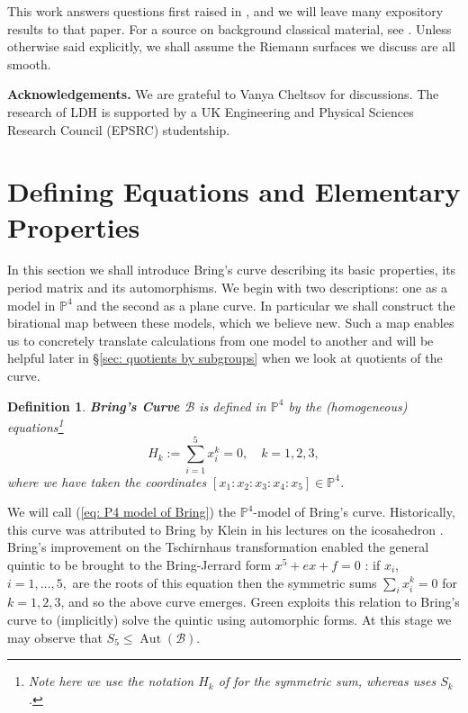\documentclass{amsart}
\newtheorem{definition}[theorem]{Definition}
\newcommand{\bam}[1]{\textbf{#1}}
\DeclareMathOperator{\Aut}{Aut}
\begin{document}
This work answers questions first raised in \cite{Braden2012}, and we will leave many expository results to that paper. For a source on background classical material, see \cite{Farkas1992}. Unless otherwise said explicitly, we shall assume the Riemann surfaces we discuss are all smooth. 

\vspace{0.1in}
\noindent\textbf{Acknowledgements.} We are grateful to Vanya Cheltsov for discussions. The research of LDH is supported by a UK Engineering and Physical Sciences Research Council (EPSRC) studentship. 

\section{Defining Equations and Elementary Properties}\label{sec: defining equations}


In this section we shall introduce Bring's curve describing its basic properties, its period matrix and its automorphisms. We begin with two descriptions: one as a model in $\mathbb{P}^4$ and the second as a plane curve. In particular we shall construct the birational map between these models, which we believe new. Such a map enables us to concretely translate calculations from one model to another and will be helpful later in \S\ref{sec: quotients by subgroups} when we look at quotients of the curve. 

\begin{definition}
\bam{Bring's Curve $\mathcal{B}$} is defined in $\mathbb{P}^4$ by the (homogeneous) equations\footnote{Note here we use the notation $H_k$ of \cite{Burns1983} for the symmetric sum, whereas \cite{Edge1978} uses $S_k$.}
\begin{equation}\label{eq: P4 model of Bring}
H_k := \sum_{i=1}^5 x_i^k = 0  , \quad k=1, 2, 3, 
\end{equation}
where we have taken the coordinates $[x_1 : x_2 : x_3 : x_4 : x_5] \in \mathbb{P}^4$. 
\end{definition}
We will call (\ref{eq: P4 model of Bring}) the
$\mathbb{P}^4$-model of Bring's curve.
Historically, this curve was attributed to Bring by Klein in his lectures on the icosahedron \cite{Klein1888}. Bring's improvement on the Tschirnhaus transformation enabled the general quintic to be brought to the Bring-Jerrard form $x^5 + ex+f=0$ \cite{Adamchik2003}: if $x_i$, $i=1,\dots, 5,$ are the roots of this equation then the symmetric sums $\sum_i x_i^k=0$ for $k=1, 2, 3$, and so the above curve emerges. Green \cite{Green1978} exploits this relation to Bring's curve to (implicitly) solve the quintic using automorphic forms. At this stage we may observe that $S_5\leq \Aut(\mathcal{B})$.
\end{document}
